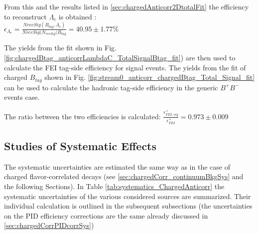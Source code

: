 \vspace{0.5 cm}
From this and the results listed in \cref{sec:chargedAnticorr2DtotalFit} 
the efficiency to reconstruct ${\Lambda_c}$ is obtained : \\

$\epsilon_{\Lambda_c} = \frac{NrecSig(B_{tag}, \Lambda_c) }{NrecSig(N_{recSig}(B_{tag}} = 40.95 \pm 1.77 \%$  %
\vspace{0.2 cm}

The yields from the fit shown in  Fig. \ref{fig:chargedBtag_anticorrLambdaC_TotalSignalBtag_fit}) are then used to calculate the FEI tag-side efficiency for signal events. The yields from the fit of charged $B_{tag}$ shown in Fig. \ref{fig:stream0_anticorr_chargedBtag_Total_Signal_fit} can be used to calculate the hadronic tag-side efficiency in the generic $B^+B^-$ events case.

The ratio between the two efficiencies is calculated: 
 $\frac{\epsilon^{+}_{FEI,  sig}}{\epsilon^{+}_{FEI}} = 0.973 \pm 0.009 $ \\\vspace{0.4 cm}


\subsection{Studies of Systematic Effects}

The systematic uncertainties are estimated the same way as in the case of charged flavor-correlated decays (see \cref{sec:chargedCorr_continuumBkgSys} and the following Sections).
In Table \ref{tab:systematics_ChargedAnticorr} the systematic uncertainties of the various considered sources are summarized.
Their individual calculation is outlined in the subsequent subsections (the uncertainties on the PID   efficiency corrections are the same already discussed in \cref{sec:chargedCorrPIDcorrSys})

